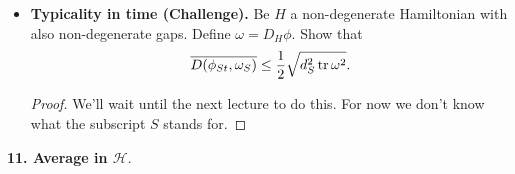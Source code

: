 \documentclass{book}
\theoremstyle{definition}
\newcommand{\lag}{\mathcal{L}}
\newcommand{\nn}{\nonumber}
\newcommand{\had}{\mathcal{H}}
\newcommand{\f}[2]{\frac{#1}{#2}}
\newcommand{\lp}{\left(}
\newcommand{\rp}{\right)}
\newcommand{\lb}{\left[}
\newcommand{\rb}{\right]}
\begin{document}
\begin{itemize}
	
	\begin{proof}
		Well, just crank:
		\begin{align}
		\overline{\lag_t} &= \lim_{T\to \infty}\f{1}{T}\int^T_0 \braket{\phi}{\phi_t}\braket{\phi_t}{\phi}\,dt\nn\\
		&= \lim_{T\to \infty}\f{1}{T}\int^T_0 dt\, \lb \sum_n a_n^\dagger \braket{E_n}{e^{-iHt}\phi e^{iHt}}  \rb \times \text{c.c.}\nn\\
		&= \lim_{T\to \infty}\f{1}{T}\int^T_0 dt\, \lb \sum_n \sum_m a_n^\dagger a_m \braket{E_n}{E_m} e^{-i(E_n - E_m)t}  \rb \times \text{c.c.}\nn\\
		&= \sum_{n,m} a^\dagger_n a_n a_m^\dagger a_m\nn\\
		&= \tr  \lp \sum_n a_n^\dagger a_n \ket{n}\bra{n} \sum_m a_m^\dagger a_m\ket{m}\bra{m} \rp \nn\\
		&= \tr \lp \lb \sum_n \abs{a_n}^2 P_n \rb^2  \rp   \nn\\
		&= \tr(\bar{\phi}^2).
		\end{align}
		In the case of mixed states, we can define the Loschmidt echo as
		\begin{align}
		\Tr(\phi^\dagger \phi_t)
		\end{align}
		where $\phi$ and $\phi_t$ are now operators. 
	\end{proof}
	
	
	\item \textbf{Typicality in time (Challenge).} Be $H$ a non-degenerate Hamiltonian with also non-degenerate gaps. Define $\omega = D_H \phi$. Show that 
	\begin{align}
	\overline{D(\phi_{St}, \omega_S)} \leq \f{1}{2}\sqrt{d_S^2\tr \omega^2}.
	\end{align}
	
	
	\begin{proof}
		We'll wait until the next lecture to do this. For now we don't know what the subscript $S$ stands for. 
	\end{proof}
	
	
	
	
	
	
\end{itemize}




\noindent \textbf{11. Average in $\had$}.
\end{document}
